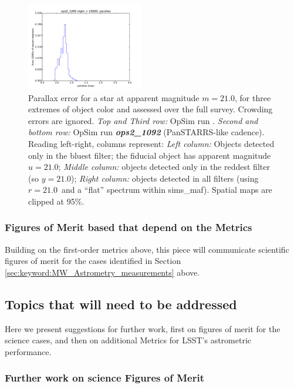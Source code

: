 \begin{figure}[ht]
\begin{center}
  \includegraphics[width=2.0in]{./figs/milkyway/MW_Astrom_paError_1092_10y_hst.pdf}
  \end{center}
  \caption{Parallax error for a star at apparent magnitude $m=21.0$, for three extremes of object color and assessed over the full survey. Crowding errors are ignored. {\it Top and Third row:} OpSim run . {\it Second and bottom row:} OpSim run {\it \bf ops2\_1092} (PanSTARRS-like cadence). Reading left-right, columns represent: {\it Left column:} Objects detected only in the bluest filter; the fiducial object has apparent magnitude $u=21.0$; {\it Middle column:} objects detected only in the reddest filter (so $y = 21.0$); {\it Right column:} objects detected in all filters (using $r=21.0$~and a ``flat'' spectrum within sims\_maf). Spatial maps are clipped at 95\%.}
  \label{fig_astrom_ByFilter_paError}
\end{figure}

\subsubsection{Figures of Merit based that depend on the Metrics}

Building on the first-order metrics above, this piece will communicate scientific figures of merit for the cases identified in Section \ref{sec:keyword:MW_Astrometry_measurements} above.

\subsection{Topics that will need to be addressed}
\label{sec:keyword:MW_Astrometry_furtherwork}

Here we present suggestions for further work, first on figures of
merit for the science cases, and then on additional Metrics for LSST's
astrometric performance.

\subsubsection{Further work on science Figures of Merit}

